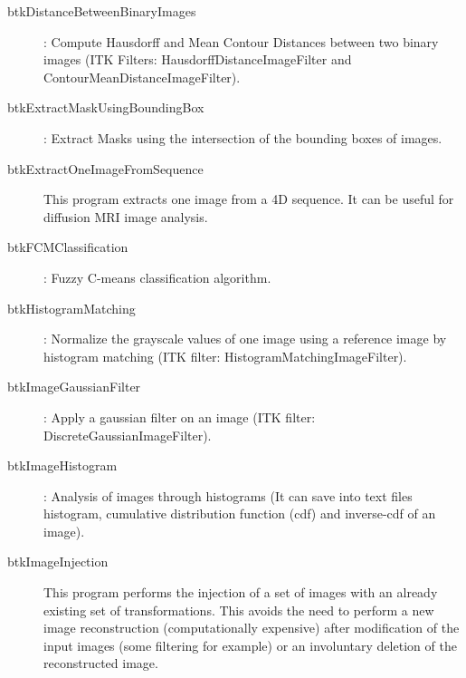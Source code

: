 \begin{description}
\item[btkDistanceBetweenBinaryImages]: Compute Hausdorff and Mean Contour Distances between two binary images (ITK Filters: HausdorffDistanceImageFilter and ContourMeanDistanceImageFilter).
\item[btkExtractMaskUsingBoundingBox]: Extract Masks using the intersection of the bounding boxes of images.
\item[btkExtractOneImageFromSequence] This program extracts one image from a 4D sequence. It can be useful for diffusion MRI image analysis. 
\item[btkFCMClassification]: Fuzzy C-means classification algorithm.
\item[btkHistogramMatching]: Normalize the grayscale values of one image using a reference image by histogram matching (ITK filter: HistogramMatchingImageFilter).
\item[btkImageGaussianFilter]: Apply a gaussian filter on an image (ITK filter: DiscreteGaussianImageFilter).
\item[btkImageHistogram]: Analysis of images through histograms (It can save into text files histogram, cumulative distribution function (cdf) and inverse-cdf of an image).
\item[btkImageInjection] This program performs the injection of a set
of images with an already existing set of transformations. This avoids the need
to perform a new image reconstruction (computationally expensive) after
modification of the input images (some filtering for example) or an involuntary
deletion of the reconstructed image.


\end{description}
